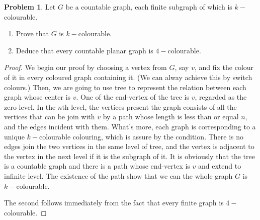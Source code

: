 \documentclass[a4paper,11pt]{article}%
\theoremstyle{remark}
\theoremstyle{definition}
\newtheorem{problem}{Problem}[subsection]
\begin{document}
\begin{problem}
    Let $G$ be a countable graph, each finite subgraph of which is $k-$colourable.
    \begin{enumerate}
        \item Prove that $G$ is $k-$colourable.
        \item Deduce that every countable planar graph is $4-$colourable.
    \end{enumerate}
    \begin{proof}
        We begin our proof by choosing a vertex from $G$, say $v$, and fix the colour of it in every coloured graph containing it.
        (We can alway achieve this by switch colours.) Then, we are going to use tree to represent the relation between each graph whose 
        center is $v$. One of the end-vertex of the tree is $v$, regarded as the zero level. In the $n$th level,  
        the vertices present the graph consists of all the vertices that can be join with $v$ by a path whose length is less than or equal 
        $n$, and the edges incident with them. What's more, each graph is corresponding to a unique $k-$colourable colouring, 
        which is assure by the condition.
        There is no edges join the two vertices in the same level of tree, and the vertex is adjacent to the vertex in the next level 
        if it is the subgraph of it.
        It is obviously that the tree is a countable graph and there is a path whose end-vertex is $v$ and extend to infinite level.
        The existence of the path show that we can the whole graph $G$ is $k-$colourable.
        
        The second follows immediately from the fact that every finite graph is $4-$colourable.
    \end{proof}
\end{problem}
\end{document}
